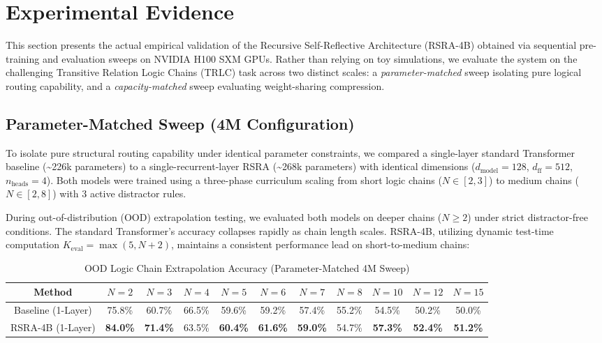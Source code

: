 \documentclass[11pt,a4paper]{article}
\theoremstyle{definition}
\begin{document}
\section{Experimental Evidence}

This section presents the actual empirical validation of the Recursive Self-Reflective Architecture (RSRA-4B) obtained via sequential pre-training and evaluation sweeps on NVIDIA H100 SXM GPUs. Rather than relying on toy simulations, we evaluate the system on the challenging Transitive Relation Logic Chains (TRLC) task across two distinct scales: a \textit{parameter-matched} sweep isolating pure logical routing capability, and a \textit{capacity-matched} sweep evaluating weight-sharing compression.

\subsection{Parameter-Matched Sweep (4M Configuration)}

To isolate pure structural routing capability under identical parameter constraints, we compared a single-layer standard Transformer baseline (\textasciitilde 226k parameters) to a single-recurrent-layer RSRA (\textasciitilde 268k parameters) with identical dimensions ($d_{\text{model}}=128$, $d_{\text{ff}}=512$, $n_{\text{heads}}=4$). Both models were trained using a three-phase curriculum scaling from short logic chains ($N \in [2, 3]$) to medium chains ($N \in [2, 8]$) with 3 active distractor rules.

During out-of-distribution (OOD) extrapolation testing, we evaluated both models on deeper chains ($N \ge 2$) under strict distractor-free conditions. The standard Transformer's accuracy collapses rapidly as chain length scales. RSRA-4B, utilizing dynamic test-time computation $K_{\text{eval}} = \max(5, N+2)$, maintains a consistent performance lead on short-to-medium chains:

\begin{table}[h]
\centering
\caption{OOD Logic Chain Extrapolation Accuracy (Parameter-Matched 4M Sweep)}
\label{tab:parameter_matched}
\begin{tabular}{ccccccccccc}
\toprule
Method & $N=2$ & $N=3$ & $N=4$ & $N=5$ & $N=6$ & $N=7$ & $N=8$ & $N=10$ & $N=12$ & $N=15$ \\
\midrule
Baseline (1-Layer) & 75.8\% & 60.7\% & 66.5\% & 59.6\% & 59.2\% & 57.4\% & 55.2\% & 54.5\% & 50.2\% & 50.0\% \\
RSRA-4B (1-Layer) & \textbf{84.0\%} & \textbf{71.4\%} & 63.5\% & \textbf{60.4\%} & \textbf{61.6\%} & \textbf{59.0\%} & 54.7\% & \textbf{57.3\%} & \textbf{52.4\%} & \textbf{51.2\%} \\
\bottomrule
\end{tabular}
\end{table}
\end{document}
